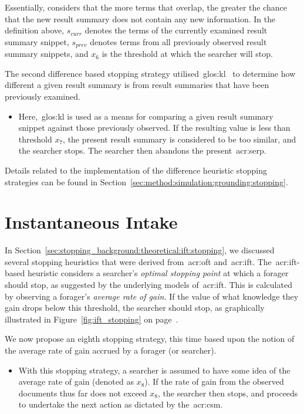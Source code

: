 Essentially,  considers that the more terms that overlap, the greater the chance that the new result summary does not contain any new information. In the definition above, $s_{curr}$ denotes the terms of the currently examined result summary snippet, $s_{prev}$ denotes terms from all previously observed result summary snippets, and $x_6$ is the threshold at which the searcher will stop.

The second difference based stopping strategy utilised~\gls{glos:kl}~\citep{kullback1951information} to determine how different a given result summary is from result summaries that have been previously examined.

\begin{itemize}
    \item{ Here,~\gls{glos:kl} is used as a means for comparing a given result summary snippet against those previously observed. If the resulting value is less than threshold $x_7$, the present result summary is considered to be too similar, and the searcher stops. The searcher then abandons the present~\gls{acr:serp}.}
\end{itemize}

Details related to the implementation of the difference heuristic stopping strategies can be found in Section~\ref{sec:method:simulation:grounding:stopping}.

\section{Instantaneous Intake}
In Section~\ref{sec:stopping_background:theoretical:ift:stopping}, we discussed several stopping heuristics that were derived from~\gls{acr:oft} and~\gls{acr:ift}. The~\gls{acr:ift}-based heuristic considers a searcher's \emph{optimal stopping point} at which a forager should stop, as suggested by the underlying models of~\gls{acr:ift}. This is calculated by observing a forager's \emph{average rate of gain.} If the value of what knowledge they gain drops below this threshold, the searcher should stop, as graphically illustrated in Figure~\ref{fig:ift_stopping} on page~\pageref{fig:ift_stopping}.

We now propose an eighth stopping strategy, this time based upon the notion of the average rate of gain accrued by a forager (or searcher).

\begin{itemize}
    \item{ With this stopping strategy, a searcher is assumed to have some idea of the average rate of gain (denoted as $x_8$). If the rate of gain from the observed documents thus far does not exceed $x_8$, the searcher then stops, and proceeds to undertake the next action as dictated by the~\gls{acr:csm}.}
\end{itemize}

